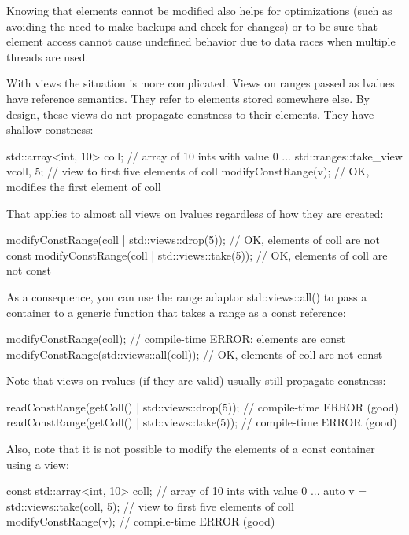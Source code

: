 Knowing that elements cannot be modified also helps for optimizations (such as avoiding the need to make backups and check for changes) or to be sure that element access cannot cause undefined behavior due to data races when multiple threads are used.

With views the situation is more complicated. Views on ranges passed as lvalues have reference semantics. They refer to elements stored somewhere else. By design, these views do not propagate constness to their elements. They have shallow constness:

\begin{cpp}
std::array<int, 10> coll{}; // array of 10 ints with value 0
...
std::ranges::take_view v{coll, 5}; // view to first five elements of coll
modifyConstRange(v); // OK, modifies the first element of coll
\end{cpp}

That applies to almost all views on lvalues regardless of how they are created:

\begin{cpp}
modifyConstRange(coll | std::views::drop(5)); // OK, elements of coll are not const
modifyConstRange(coll | std::views::take(5)); // OK, elements of coll are not const
\end{cpp}

As a consequence, you can use the range adaptor std::views::all() to pass a container to a generic function that takes a range as a const reference:

\begin{cpp}
modifyConstRange(coll); // compile-time ERROR: elements are const
modifyConstRange(std::views::all(coll)); // OK, elements of coll are not const
\end{cpp}

Note that views on rvalues (if they are valid) usually still propagate constness:

\begin{cpp}
readConstRange(getColl() | std::views::drop(5)); // compile-time ERROR (good)
readConstRange(getColl() | std::views::take(5)); // compile-time ERROR (good)
\end{cpp}

Also, note that it is not possible to modify the elements of a const container using a view:

\begin{cpp}
const std::array<int, 10> coll{}; // array of 10 ints with value 0
...
auto v = std::views::take(coll, 5); // view to first five elements of coll
modifyConstRange(v); // compile-time ERROR (good)
\end{cpp}

